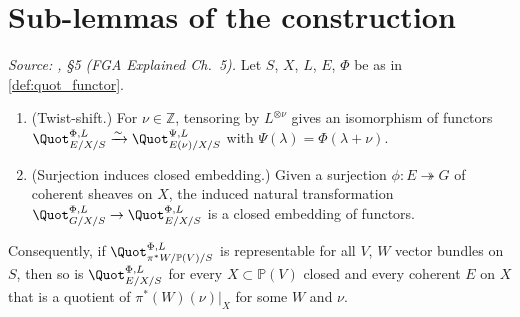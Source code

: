\section{Sub-lemmas of the construction}
\label{sec:quot_sub_lemmas}

\begin{lemma}
  \label{lem:quot_reduction_to_pi_star_W}

  \textit{Source: \cite{nitsure-hilbert-quot}, \S 5 (FGA Explained Ch.~5).}
  Let \(S\), \(X\), \(L\), \(E\), \(\Phi\) be as in \cref{def:quot_functor}.
  \begin{enumerate}
    \item (Twist-shift.) For \(\nu \in \mathbb{Z}\), tensoring by
      \(L^{\otimes \nu}\) gives an isomorphism of functors
      \(\Quot^{\Phi,L}_{E/X/S} \xrightarrow{\sim}
      \Quot^{\Psi,L}_{E(\nu)/X/S}\) with \(\Psi(\lambda) = \Phi(\lambda + \nu)\).
    \item (Surjection induces closed embedding.) Given a surjection
      \(\phi : E \twoheadrightarrow G\) of coherent sheaves on \(X\), the
      induced natural transformation
      \(\Quot^{\Phi,L}_{G/X/S} \to \Quot^{\Phi,L}_{E/X/S}\) is a closed
      embedding of functors.
  \end{enumerate}
  Consequently, if \(\Quot^{\Phi,L}_{\pi^* W / \mathbb{P}(V)/S}\) is
  representable for all \(V\), \(W\) vector bundles on \(S\), then so is
  \(\Quot^{\Phi,L}_{E/X/S}\) for every \(X \subset \mathbb{P}(V)\) closed and
  every coherent \(E\) on \(X\) that is a quotient of \(\pi^*(W)(\nu)|_X\) for
  some \(W\) and \(\nu\).
\end{lemma}

